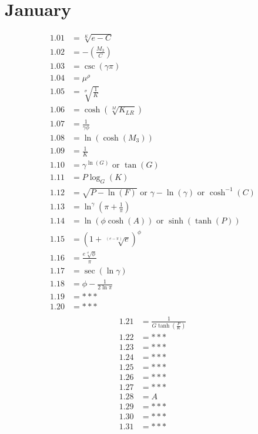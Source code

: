 \documentclass[12pt]{article}
\newcommand{\oder}{\text{ or }}
\begin{document}
\section{January}
\begin{align*}
1.01 &= \sqrt[K]{e-C}\\
1.02 &= -\left(\frac{M_{3}}{C}\right)\\
1.03 &= \csc{(\gamma \pi)}\\
1.04 &= \mu^{\rho}\\
1.05 &= \sqrt[\sigma]{\frac{1}{K}}\\
1.06 &= \cosh\left(\sqrt[M]{K_{LR}}\right)\\
1.07 &= \frac{1}{\gamma \phi}\\
1.08 &= \ln\left(\cosh\left(M_{3}\right)\right)\\
1.09 &= \frac{1}{K}\\
1.10 &= \gamma^{\ln\left(G\right)} \oder \tan(G)\\
1.11 &= P\log_{G}\left(K\right)\\
1.12 &= \sqrt{P - \ln(F)} \oder \gamma - \ln(\gamma) \oder \cosh^{-1}(C)\\
1.13 &= \ln^{\gamma}\left(\pi + \frac{1}{\pi}\right)\\
1.14 &= \ln\left(\phi \cosh(A)\right) \oder \sinh\left(\tanh(P)\right)\\
1.15 &= \left(1 + \sqrt[\left(e-\pi\right)]{e}\right)^{\phi}\\
1.16 &= \frac{e \sqrt[\phi]{\phi}}{\pi}\\
1.17 &= \sec(\ln \gamma)\\
1.18 &= \phi - \frac{1}{2\ln\pi}\\
1.19 &= ***\\
1.20 &= ***\\
\end{align*}
\begin{align*}
1.21 &= \frac{1}{G\tanh\left(\frac{P}{K}\right)}\\
1.22 &= ***\\
1.23 &= ***\\
1.24 &= ***\\
1.25 &= ***\\
1.26 &= ***\\
1.27 &= ***\\
1.28 &= A\\
1.29 &= ***\\
1.30 &= ***\\
1.31 &= ***\\
\end{align*}
\end{document}
